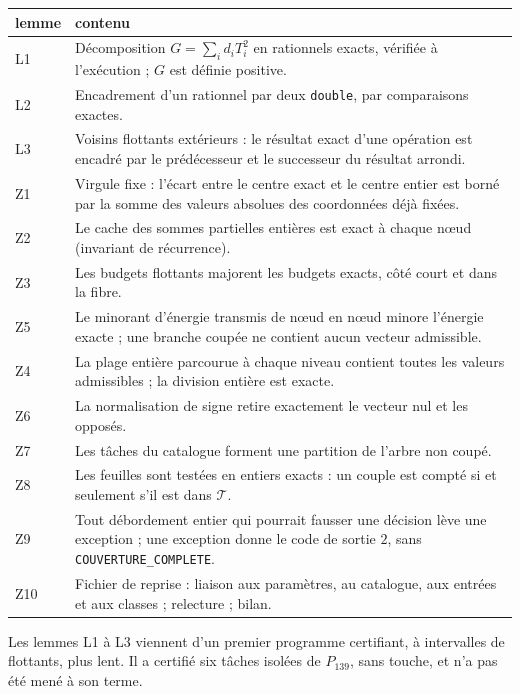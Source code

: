 \documentclass[11pt,a4paper]{amsart}
\theoremstyle{plain}
\theoremstyle{definition}
\numberwithin{equation}{section}
\newcommand{\Tc}{\mathcal{T}}
\begin{document}
\begin{center}\small
\begin{tabular}{l>{\raggedright\arraybackslash}p{11.6cm}}
\toprule
lemme & contenu \\
\midrule
L1 & Décomposition $G=\sum_id_iT_i^2$ en rationnels exacts, vérifiée à l'exécution ; $G$ est définie positive. \\
L2 & Encadrement d'un rationnel par deux \texttt{double}, par comparaisons exactes. \\
L3 & Voisins flottants extérieurs : le résultat exact d'une opération est encadré par le prédécesseur et le successeur du résultat arrondi. \\
Z1 & Virgule fixe : l'écart entre le centre exact et le centre entier est borné par la somme des valeurs absolues des coordonnées déjà fixées. \\
Z2 & Le cache des sommes partielles entières est exact à chaque nœud (invariant de récurrence). \\
Z3 & Les budgets flottants majorent les budgets exacts, côté court et dans la fibre. \\
Z5 & Le minorant d'énergie transmis de nœud en nœud minore l'énergie exacte ; une branche coupée ne contient aucun vecteur admissible. \\
Z4 & La plage entière parcourue à chaque niveau contient toutes les valeurs admissibles ; la division entière est exacte. \\
Z6 & La normalisation de signe retire exactement le vecteur nul et les opposés. \\
Z7 & Les tâches du catalogue forment une partition de l'arbre non coupé. \\
Z8 & Les feuilles sont testées en entiers exacts : un couple est compté si et seulement s'il est dans $\Tc$. \\
Z9 & Tout débordement entier qui pourrait fausser une décision lève une exception ; une exception donne le code de sortie $2$, sans \texttt{COUVERTURE\_COMPLETE}. \\
Z10 & Fichier de reprise : liaison aux paramètres, au catalogue, aux entrées et aux classes ; relecture ; bilan. \\
\bottomrule
\end{tabular}
\end{center}

Les lemmes L1 à L3 viennent d'un premier programme certifiant, à intervalles de flottants, plus lent. Il a certifié six tâches isolées de $P_{139}$, sans touche, et n'a pas été mené à son terme.
\end{document}

